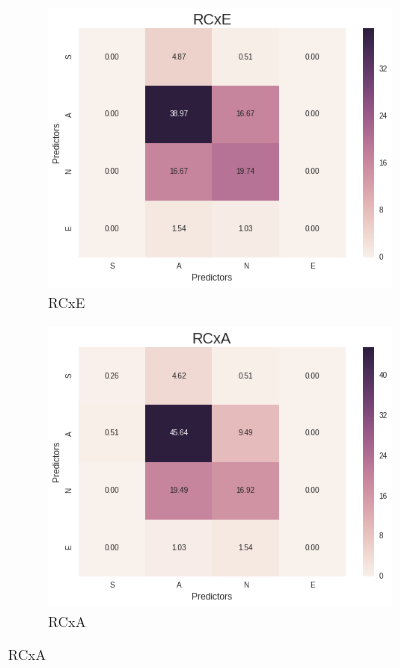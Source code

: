 \documentclass[12pt,a4paper,catalan]{article}
\begin{document}
\begin{figure}[h]
\centering
\begin{subfigure}{.42\textwidth}
  \centering
  \includegraphics[width=\linewidth]{img/heatmap_rcxe_primersegon_tercer.png}
  \caption{RCxE}
\end{subfigure}
\begin{subfigure}{.42\textwidth}
  \centering
  \includegraphics[width=\linewidth]{img/heatmap_rcxa_primersegon_tercer.png}
  \caption{RCxA}
\end{subfigure}
\end{figure}
\end{document}

